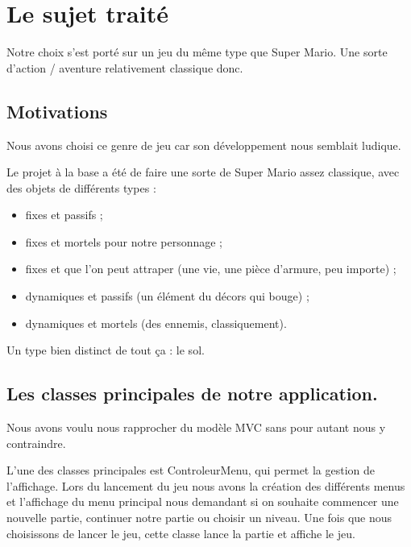 \chapter{Le sujet traité}

Notre choix s'est porté sur un jeu du même type que Super Mario.
Une sorte d'action / aventure relativement classique donc.

\section{Motivations}

Nous avons choisi ce genre de jeu car son développement nous semblait ludique.

Le projet à la base a été de faire une sorte de Super Mario assez classique, avec des objets de différents types :
\begin{itemize}
	\item fixes et passifs ;
	\item fixes et mortels pour notre personnage ;
	\item fixes et que l'on peut attraper (une vie, une pièce d'armure, peu importe) ;
	\item dynamiques et passifs (un élément du décors qui bouge) ;
	\item dynamiques et mortels (des ennemis, classiquement).
\end{itemize}

Un type bien distinct de tout ça : le sol.


\section{Les classes principales de notre application.}

Nous avons voulu nous rapprocher du modèle MVC sans pour autant nous y contraindre.

L'une des classes principales est ControleurMenu, qui permet la gestion de l'affichage.
Lors du lancement du jeu nous avons la création des différents menus et l'affichage du menu principal nous demandant si on souhaite commencer une nouvelle partie,
continuer notre partie ou choisir un niveau.
Une fois que nous choisissons de lancer le jeu, cette classe lance la partie et affiche le jeu.



